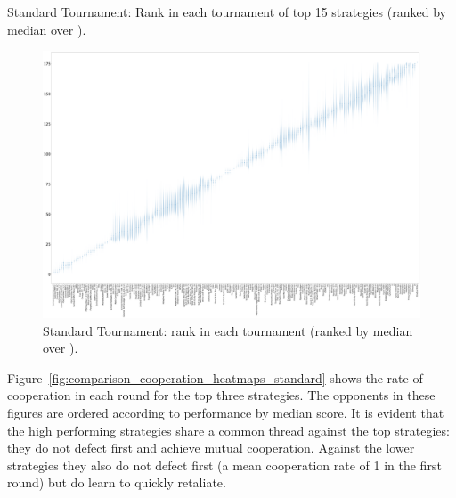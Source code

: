 \documentclass{article}
\begin{document}
\begin{table}[!hbtp]
    \centering
        
        \caption{Standard Tournament: Rank in each tournament
        of top 15 strategies (ranked by median over
        \protecttournaments).}
        \label{tbl:standard_ranks}
\end{table}

\begin{landscape}
    \begin{figure}[!hbtp]
        \centering
        \includegraphics[width=\paperwidth]{./assets/standard_ranks_boxplots.pdf}
        \caption{Standard Tournament: rank in each tournament (ranked by
        median over
        \protecttournaments).}
        \label{fig:standard_ranks_boxplot}
    \end{figure}
\end{landscape}

Figure~\ref{fig:comparison_cooperation_heatmaps_standard} shows the rate of
cooperation in each round for the top three strategies. The opponents in these
figures are ordered according to performance by median score. It is evident that
the high performing strategies share a common thread against the top strategies:
they do not defect first and achieve mutual cooperation. Against the lower
strategies they also do not defect first (a mean cooperation rate of 1 in the
first round) but do learn to quickly retaliate.
\end{document}
